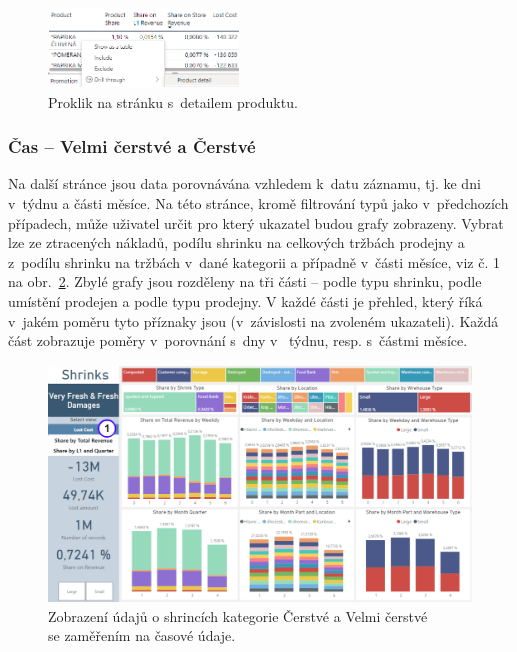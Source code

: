 \begin{figure}[h!]
    \centering
    \captionsetup{justification=centering}
    \includegraphics[width=0.45\textwidth]{obrazky/PBI/detaildrill.png}
    \caption{Proklik na stránku s~detailem produktu.}
    \label{obr:PBI:drilldetail}
\end{figure}

\subsubsection*{Čas -- Velmi čerstvé a Čerstvé}

Na další stránce jsou data porovnávána vzhledem k~datu záznamu, tj. ke dni v~týdnu a části měsíce. Na této stránce, kromě filtrování typů jako v~předchozích případech, může uživatel určit pro který ukazatel budou grafy zobrazeny. Vybrat lze ze ztracených nákladů, podílu shrinku na celkových tržbách prodejny a z~podílu shrinku na tržbách v~dané kategorii a případně v~části měsíce, viz č. 1 na obr.~\ref*{obr:PBI:timeSFF}. Zbylé grafy jsou rozděleny na tři části -- podle typu shrinku, podle umístění prodejen a podle typu prodejny. V každé části je přehled, který říká v~jakém poměru tyto příznaky jsou (v~závislosti na zvoleném ukazateli). Každá část zobrazuje poměry v~porovnání s~dny v~ týdnu, resp. s~částmi měsíce.

\begin{figure}[h!]
    \centering
    \captionsetup{justification=centering}
    \includegraphics[width=\textwidth]{obrazky/PBI/timeSFF.png}
    \caption{Zobrazení údajů o shrincích kategorie Čerstvé a Velmi čerstvé \\ se zaměřením na časové údaje.}
    \label{obr:PBI:timeSFF}
\end{figure}

